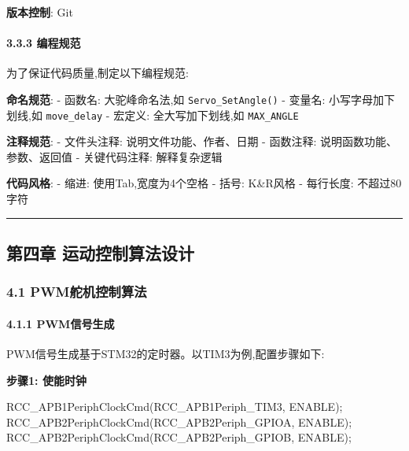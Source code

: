 \documentclass[
]{article}
\newenvironment{Shaded}{}{}
\newcommand{\NormalTok}[1]{#1}
\begin{document}
\textbf{版本控制}: Git

\hypertarget{ux7f16ux7a0bux89c4ux8303}{%
\paragraph{3.3.3 编程规范}\label{ux7f16ux7a0bux89c4ux8303}}

为了保证代码质量,制定以下编程规范:

\textbf{命名规范}: - 函数名: 大驼峰命名法,如 \texttt{Servo\_SetAngle()}
- 变量名: 小写字母加下划线,如 \texttt{move\_delay} - 宏定义:
全大写加下划线,如 \texttt{MAX\_ANGLE}

\textbf{注释规范}: - 文件头注释: 说明文件功能、作者、日期 - 函数注释:
说明函数功能、参数、返回值 - 关键代码注释: 解释复杂逻辑

\textbf{代码风格}: - 缩进: 使用Tab,宽度为4个空格 - 括号: K\&R风格 -
每行长度: 不超过80字符

\begin{center}\rule{0.5\linewidth}{0.5pt}\end{center}

\hypertarget{ux7b2cux56dbux7ae0-ux8fd0ux52a8ux63a7ux5236ux7b97ux6cd5ux8bbeux8ba1}{%
\subsection{第四章
运动控制算法设计}\label{ux7b2cux56dbux7ae0-ux8fd0ux52a8ux63a7ux5236ux7b97ux6cd5ux8bbeux8ba1}}

\hypertarget{pwmux8235ux673aux63a7ux5236ux7b97ux6cd5}{%
\subsubsection{4.1
PWM舵机控制算法}\label{pwmux8235ux673aux63a7ux5236ux7b97ux6cd5}}

\hypertarget{pwmux4fe1ux53f7ux751fux6210}{%
\paragraph{4.1.1 PWM信号生成}\label{pwmux4fe1ux53f7ux751fux6210}}

PWM信号生成基于STM32的定时器。以TIM3为例,配置步骤如下:

\textbf{步骤1: 使能时钟}

\begin{Shaded}
\begin{Highlighting}[]
\NormalTok{RCC\_APB1PeriphClockCmd(RCC\_APB1Periph\_TIM3, ENABLE);}
\NormalTok{RCC\_APB2PeriphClockCmd(RCC\_APB2Periph\_GPIOA, ENABLE);}
\NormalTok{RCC\_APB2PeriphClockCmd(RCC\_APB2Periph\_GPIOB, ENABLE);}
\end{Highlighting}
\end{Shaded}
\end{document}
